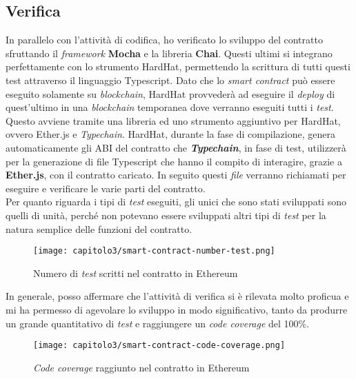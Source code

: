 \subsection{Verifica}
In parallelo con l'attività di codifica, ho verificato lo sviluppo del contratto sfruttando il \textit{framework} \textbf{Mocha} e la libreria \textbf{Chai}. Questi ultimi si integrano perfettamente con lo strumento HardHat, permettendo la scrittura di tutti questi test attraverso il linguaggio Typescript. Dato che lo \textit{smart contract} può essere eseguito solamente su \textit{blockchain}, HardHat provvederà ad eseguire il \textit{deploy} di quest'ultimo in una \textit{blockchain} temporanea dove verranno eseguiti tutti i \textit{test}. Questo avviene tramite una libreria ed uno strumento aggiuntivo per HardHat, ovvero Ether.js e \textit{Typechain}. HardHat, durante la fase di compilazione, genera automaticamente gli ABI del contratto che \textbf{\textit{Typechain}}, in fase di test, utilizzerà per la generazione di file Typescript che hanno il compito di interagire, grazie a \textbf{Ether.js}, con il contratto caricato. In seguito questi \textit{file} verranno richiamati per eseguire e verificare le varie parti del contratto. \\

Per quanto riguarda i tipi di \textit{test} eseguiti, gli unici che sono stati sviluppati sono quelli di unità, perché non potevano essere sviluppati altri tipi di \textit{test} per la natura semplice delle funzioni del contratto.

\begin{figure}[h!]
  \centering
  \texttt{[image: capitolo3/smart-contract-number-test.png]}
  \caption{Numero di \textit{test} scritti nel contratto in Ethereum}
\end{figure}

In generale, posso affermare che l'attività di verifica si è rilevata molto proficua e mi ha permesso di agevolare lo sviluppo in modo significativo, tanto da produrre un grande quantitativo di \textit{test} e raggiungere un \textit{code coverage} del 100\%.

\begin{figure}[h!]
  \centering
  \texttt{[image: capitolo3/smart-contract-code-coverage.png]}
  \caption{\textit{Code coverage} raggiunto nel contratto in Ethereum}
\end{figure}
